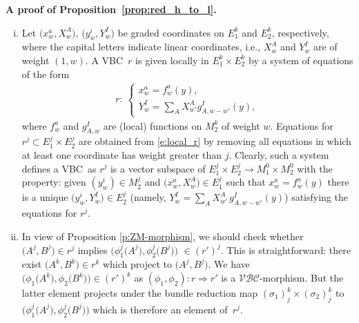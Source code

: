 \documentclass[pdftex]{sigma}
\newcommand{\ZM}{{VBC}} %
\newcommand{\ra}{\rightarrow}
\newcommand{\mZM}{\Rightarrow}
\newcommand{\catZM}{{\mathcal{VBC}}} %
\numberwithin{equation}{section}
\theoremstyle{definition}
\begin{document}
{\bf A proof of Proposition~\ref{prop:red_h_to_l}.}%
\begin{enumerate}[(i)]\itemsep=0pt
\item Let $\big(x^a_{w}, X^A_{w}\big)$, $\big(y^i_{w}, Y^I_{w}\big)$ be graded coordinates on $E_1^k$ and $E_2^k$, respectively, where the capital letters indicate linear coordinates, i.e., $X^A_{w}$ and $Y^I_{w}$ are of weight $(1, w)$. A \ZM\ $r$ is given locally in $E_1^k \times E_2^k$ by a system of equations of the form
\begin{gather}\label{e:local_r}
r\colon \
\begin{cases}
x^a_{w} = f^a_{w}(y), \\
Y^I_{w} = \sum_A X^A_{w'} g_{A, w-w'}^I(y),
\end{cases}
\end{gather}
where $f^a_{w}$ and $g_{A, w}^I$ are (local) functions on $M_2^k$ of weight $w$. Equations for $r^{j} \subset E_1^j\times E_2^j$ are obtained from \eqref{e:local_r} by removing all equations in which at least one coordinate has weight greater than $j$. Clearly, such a system defines a \ZM\ as $r^j$ is a vector subspace of $E_1^j\times E_2^j \ra M_1^0\times M_2^0$ with the property: given $(y^i_{w})\in M_2^j$ and $\big(x_{w}^a, X_{w}^A\big) \in E_1^j$ such that $x^a_{w} = f^a_{w}(y)$ there is a unique $\big(y^i_{w}, Y^I_{w}\big) \in E_2^j$ (namely, $Y^I_{w}=\sum_A X^A_{w'} \, g_{A, w-w'}^I(y)$) satisfying the equations for $r^j$.

\item In view of Proposition \ref{p:ZM-morphism}, we should check whether $\big(A^j, B^j\big)\in r^j$ implies $\big(\phi_1^j\big(A^j\big), \phi_2^j\big(B^j\big)\big)$ $\in (r')^j$. This is straightforward: there exist $\big(A^k, B^k\big) \in r^k$ which project to $\big(A^j, B^j\big)$. We have $\big(\phi_1\big(A^k\big), \phi_2\big(B^k\big)\big) \in (r')^k$ as $(\phi_1, \phi_2)\colon r \mZM r'$ is a $\catZM$-morphism. But the latter element projects under the bundle reduction map $(\sigma_1)^k_j \times (\sigma_2)^k_j$ to $\big(\phi_1^j\big(A^j\big), \phi_2^j\big(B^j\big)\big)$ which is therefore an element of~$r^j$. %
\end{enumerate}
\end{document}
